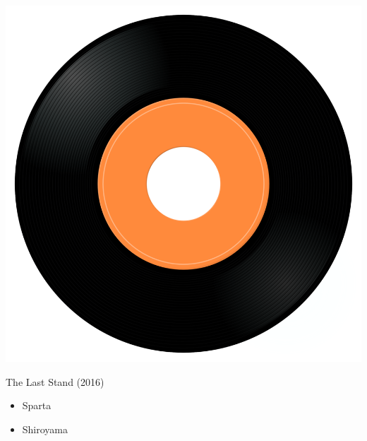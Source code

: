\begin{minipage}[t]{0.25\textwidth}\vspace{0pt}
\captionsetup{type=figure}
\includegraphics[width=\textwidth]{Images/cover.png}
\caption*{The Last Stand (2016)}
\end{minipage}
\begin{minipage}[t]{0.25\textwidth}\vspace{0pt}
\begin{itemize}[nosep,leftmargin=1em,labelwidth=*,align=left]
	\setlength{\itemsep}{0pt}
	\item Sparta
	\item Shiroyama
\end{itemize}
\end{minipage}
